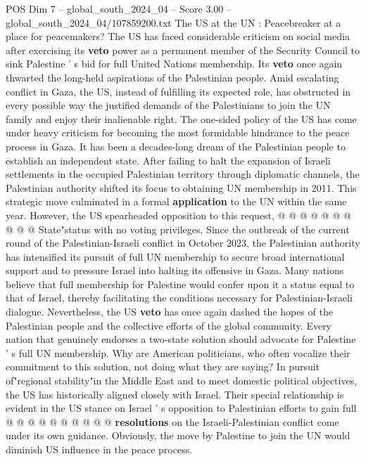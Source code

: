 \begin{textsample}{POS Dim 7 – global\_south\_2024\_04 – Score 3.00 – global\_south\_2024\_04/107859200.txt}  \label{ex:f7_pos_103}
The US at the UN : Peacebreaker at a place for peacemakers?
The US has faced considerable criticism on social media after exercising its \textbf{veto} power as a permanent member of the Security Council to sink Palestine ' s bid for full United Nations membership.
Its \textbf{veto} once again thwarted the long-held aspirations of the Palestinian people.
Amid escalating conflict in Gaza, the US, instead of fulfilling its expected role, has obstructed in every possible way the justified demands of the Palestinians to join the UN family and enjoy their inalienable right.
The one-sided policy of the US has come under heavy criticism for becoming the most formidable hindrance to the peace process in Gaza.
It has been a decades-long dream of the Palestinian people to establish an independent state.
After failing to halt the expansion of Israeli settlements in the occupied Palestinian territory through diplomatic channels, the Palestinian authority shifted its focus to obtaining UN membership in 2011.
This strategic move culminated in a formal \textbf{application} to the UN within the same year.
However, the US spearheaded opposition to this request, @ @ @ @ @ @ @ @ @ @ State"status with no voting privileges.
Since the outbreak of the current round of the Palestinian-Israeli conflict in October 2023, the Palestinian authority has intensified its pursuit of full UN membership to secure broad international support and to pressure Israel into halting its offensive in Gaza.
Many nations believe that full membership for Palestine would confer upon it a status equal to that of Israel, thereby facilitating the conditions necessary for Palestinian-Israeli dialogue.
Nevertheless, the US \textbf{veto} has once again dashed the hopes of the Palestinian people and the collective efforts of the global community.
Every nation that genuinely endorses a two-state solution should advocate for Palestine ' s full UN membership.
Why are American politicians, who often vocalize their commitment to this solution, not doing what they are saying?
In pursuit of"regional stability"in the Middle East and to meet domestic political objectives, the US has historically aligned closely with Israel.
Their special relationship is evident in the US stance on Israel ' s opposition to Palestinian efforts to gain full @ @ @ @ @ @ @ @ @ @ \textbf{resolutions} on the Israeli-Palestinian conflict come under its own guidance.
Obviously, the move by Palestine to join the UN would diminish US influence in the peace process.

\end{textsample}
